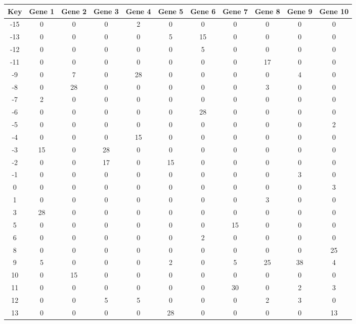 \begin{tabular}{|c|c|c|c|c|c|c|c|c|c|c|}
\hline
Key & Gene 1 & Gene 2 & Gene 3 & Gene 4 & Gene 5 & Gene 6 & Gene 7 & Gene 8 & Gene 9 & Gene 10 \\
\hline
-15 & 0 & 0 & 0 & 2 & 0 & 0 & 0 & 0 & 0 & 0 \\
-13 & 0 & 0 & 0 & 0 & 5 & 15 & 0 & 0 & 0 & 0 \\
-12 & 0 & 0 & 0 & 0 & 0 & 5 & 0 & 0 & 0 & 0 \\
-11 & 0 & 0 & 0 & 0 & 0 & 0 & 0 & 17 & 0 & 0 \\
-9 & 0 & 7 & 0 & 28 & 0 & 0 & 0 & 0 & 4 & 0 \\
-8 & 0 & 28 & 0 & 0 & 0 & 0 & 0 & 3 & 0 & 0 \\
-7 & 2 & 0 & 0 & 0 & 0 & 0 & 0 & 0 & 0 & 0 \\
-6 & 0 & 0 & 0 & 0 & 0 & 28 & 0 & 0 & 0 & 0 \\
-5 & 0 & 0 & 0 & 0 & 0 & 0 & 0 & 0 & 0 & 2 \\
-4 & 0 & 0 & 0 & 15 & 0 & 0 & 0 & 0 & 0 & 0 \\
-3 & 15 & 0 & 28 & 0 & 0 & 0 & 0 & 0 & 0 & 0 \\
-2 & 0 & 0 & 17 & 0 & 15 & 0 & 0 & 0 & 0 & 0 \\
-1 & 0 & 0 & 0 & 0 & 0 & 0 & 0 & 0 & 3 & 0 \\
0 & 0 & 0 & 0 & 0 & 0 & 0 & 0 & 0 & 0 & 3 \\
1 & 0 & 0 & 0 & 0 & 0 & 0 & 0 & 3 & 0 & 0 \\
3 & 28 & 0 & 0 & 0 & 0 & 0 & 0 & 0 & 0 & 0 \\
5 & 0 & 0 & 0 & 0 & 0 & 0 & 15 & 0 & 0 & 0 \\
6 & 0 & 0 & 0 & 0 & 0 & 2 & 0 & 0 & 0 & 0 \\
8 & 0 & 0 & 0 & 0 & 0 & 0 & 0 & 0 & 0 & 25 \\
9 & 5 & 0 & 0 & 0 & 2 & 0 & 5 & 25 & 38 & 4 \\
10 & 0 & 15 & 0 & 0 & 0 & 0 & 0 & 0 & 0 & 0 \\
11 & 0 & 0 & 0 & 0 & 0 & 0 & 30 & 0 & 2 & 3 \\
12 & 0 & 0 & 5 & 5 & 0 & 0 & 0 & 2 & 3 & 0 \\
13 & 0 & 0 & 0 & 0 & 28 & 0 & 0 & 0 & 0 & 13 \\
\hline
\end{tabular}